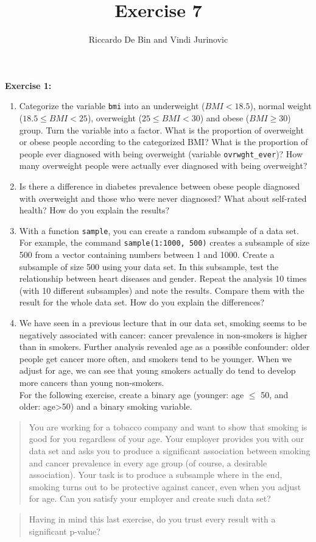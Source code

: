 \documentclass[]{article}
\title{Exercise 7}
\author{Riccardo De Bin and Vindi Jurinovic}
\date{}
\begin{document}
\maketitle


\textbf{Exercise 1:}

\begin{enumerate}
\def\labelenumi{\arabic{enumi}.}
\item
  Categorize the variable \texttt{bmi} into an underweight
  ($BMI < 18.5$), normal weight ($18.5 \leq BMI < 25$), overweight
  ($25 \leq BMI < 30$) and obese ($BMI \geq 30$) group. Turn the
  variable into a factor. What is the proportion of overweight or obese
  people according to the categorized BMI? What is the proportion of
  people ever diagnosed with being overweight (variable
  \texttt{ovrwght\_ever})? How many overweight people were actually ever
  diagnosed with being overweight?
\item
  Is there a difference in diabetes prevalence between obese people
  diagnosed with overweight and those who were never diagnosed? What
  about self-rated health? How do you explain the results?
\item
  With a function \texttt{sample}, you can create a random subsample of
  a data set. For example, the command \texttt{sample(1:1000, 500)}
  creates a subsample of size 500 from a vector containing numbers
  between 1 and 1000. Create a subsample of size 500 using your data
  set. In this subsample, test the relationship between heart diseases
  and gender. Repeat the analysis 10 times (with 10 different
  subsamples) and note the results. Compare them with the result for the
  whole data set. How do you explain the differences?
\item
  We have seen in a previous lecture that in our data set, smoking seems
  to be negatively associated with cancer: cancer prevalence in
  non-smokers is higher than in smokers. Further analysis revealed age
  as a possible confounder: older people get cancer more often, and
  smokers tend to be younger. When we adjust for age, we can see that
  young smokers actually do tend to develop more cancers than young
  non-smokers.\\ For the following exercise, create a binary age
  (younger: age $\leq$ 50, and older: age\textgreater{}50) and a binary
  smoking variable.
\end{enumerate}

\begin{quote}
You are working for a tobacco company and want to show that smoking is
good for you regardless of your age. Your employer provides you with our
data set and asks you to produce a significant association between
smoking and cancer prevalence in every age group (of course, a desirable
association). Your task is to produce a subsample where in the end,
smoking turns out to be protective against cancer, even when you adjust
for age. Can you satisfy your employer and create such data set?
\end{quote}

\begin{quote}
Having in mind this last exercise, do you trust every result with a
significant p-value?
\end{quote}
\end{document}
